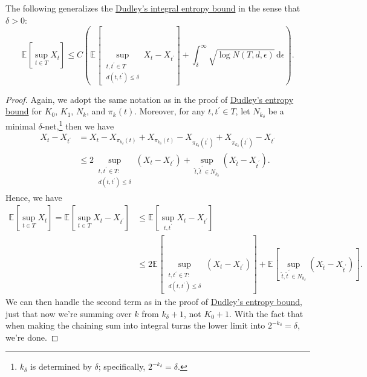 \begin{corollary}\label{pf-col:Dudley-integral-entropy-bound-finite-resolution}
	The following generalizes the \hyperref[col:Dudley-integral-entropy-bound]{Dudley's integral entropy bound} in the sense that \(\delta > 0\):
	\[
		\mathbb{E}_{}\left[\sup _{t\in T} X_t \right]
		\leq C  \left( \mathbb{E}_{}\left[ \sup _{\substack{t, t^{\prime} \in T \\ d(t, t^{\prime} ) \leq \delta }} X_t - X_{t^{\prime} } \right] + \int_{\delta }^{\infty} \sqrt{\log N(T, d, \epsilon )} \,\mathrm{d}\epsilon \right) .
	\]
\end{corollary}
\begin{proof}
	Again, we adopt the same notation as in the proof of \hyperref[thm:Dudley-entropy-bound]{Dudley's entropy bound} for \(K_0\), \(K_1\), \(N_k\), and \(\pi _k(t)\). Moreover, for any \(t, t^{\prime} \in T\), let \(N_{k_{\delta }}\) be a minimal \(\delta \)-net,\footnote{\(k_\delta \) is determined by \(\delta \); specifically, \(2^{-k_\delta } = \delta \).} then we have
	\[
		\begin{split}
			X_t - X_{t^{\prime} }
			 & = X_t - X_{\pi _{k_{\delta }}(t)} + X_{\pi _{k_{\delta }}(t)} - X_{\pi _{k_{\delta }}(t^{\prime} )} + X_{\pi _{k_{\delta }}(t^{\prime} )} - X_{t^{\prime} } \\
			 & \leq 2 \sup _{\substack{t, t^{\prime} \in T \colon                                                                                                          \\ d(t, t^{\prime} ) \leq \delta }} \left( X_t - X_{t^{\prime} } \right) + \sup _{\hat{t} , \hat{t} ^{\prime} \in N_{k_\delta }} \left( X_{\hat{t} } - X_{\hat{t} ^{\prime} } \right).
		\end{split}
	\]
	Hence, we have
	\[
		\begin{split}
			\mathbb{E}_{}\left[\sup _{t\in T} X_t \right]
			= \mathbb{E}_{}\left[\sup _{t\in T} X_t - X_{t^{\prime} } \right]
			 & \leq \mathbb{E}_{}\left[\sup _{t, t^{\prime} } X_t - X_{t^{\prime} } \right] \\
			 & \leq 2 \mathbb{E}_{}\left[ \sup _{\substack{t, t^{\prime} \in T \colon       \\ d(t, t^{\prime} ) \leq \delta }} \left( X_t - X_{t^{\prime} } \right) \right] + \mathbb{E}_{}\left[\sup _{\hat{t} , \hat{t} ^{\prime} \in N_{k_\delta }} \left( X_{\hat{t} } - X_{\hat{t} ^{\prime} } \right) \right].
		\end{split}
	\]
	We can then handle the second term as in the proof of \hyperref[thm:Dudley-entropy-bound]{Dudley's entropy bound}, just that now we're summing over \(k\) from \(k_\delta + 1\), not \(K_0 + 1\). With the fact that when making the chaining sum into integral turns the lower limit into \(2^{-k_\delta } = \delta \), we're done.
\end{proof}